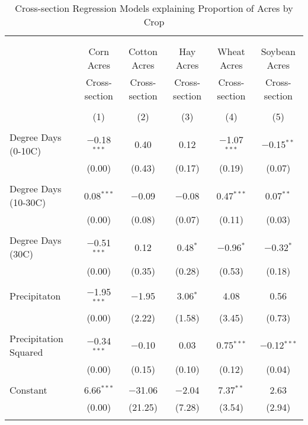 \documentclass[10pt]{article}
\begin{document}
\begin{table}[!htbp] \centering 
  \caption{Cross-section Regression Models explaining Proportion of Acres by Crop} 
  \label{} 
\footnotesize 
\begin{tabular}{@{\extracolsep{5pt}}lccccc} 
\\[-1.8ex]\hline 
\hline \\[-1.8ex] 
\\[-1.8ex] & Corn Acres & Cotton Acres & Hay Acres & Wheat Acres & Soybean Acres \\ 
 & Cross-section & Cross-section & Cross-section & Cross-section & Cross-section \\ 
\\[-1.8ex] & (1) & (2) & (3) & (4) & (5)\\ 
\hline \\[-1.8ex] 
 Degree Days (0-10C) & $-$0.18$^{***}$ & 0.40 & 0.12 & $-$1.07$^{***}$ & $-$0.15$^{**}$ \\ 
  & (0.00) & (0.43) & (0.17) & (0.19) & (0.07) \\ 
  & & & & & \\ 
 Degree Days (10-30C) & 0.08$^{***}$ & $-$0.09 & $-$0.08 & 0.47$^{***}$ & 0.07$^{**}$ \\ 
  & (0.00) & (0.08) & (0.07) & (0.11) & (0.03) \\ 
  & & & & & \\ 
 Degree Days (30C) & $-$0.51$^{***}$ & 0.12 & 0.48$^{*}$ & $-$0.96$^{*}$ & $-$0.32$^{*}$ \\ 
  & (0.00) & (0.35) & (0.28) & (0.53) & (0.18) \\ 
  & & & & & \\ 
 Precipitaton & $-$1.95$^{***}$ & $-$1.95 & 3.06$^{*}$ & 4.08 & 0.56 \\ 
  & (0.00) & (2.22) & (1.58) & (3.45) & (0.73) \\ 
  & & & & & \\ 
 Precipitation Squared & $-$0.34$^{***}$ & $-$0.10 & 0.03 & 0.75$^{***}$ & $-$0.12$^{***}$ \\ 
  & (0.00) & (0.15) & (0.10) & (0.12) & (0.04) \\ 
  & & & & & \\ 
 Constant & 6.66$^{***}$ & $-$31.06 & $-$2.04 & 7.37$^{**}$ & 2.63 \\ 
  & (0.00) & (21.25) & (7.28) & (3.54) & (2.94) \\ 
  & & & & & \\ 

\end{tabular}
\end{table}
\end{document}
